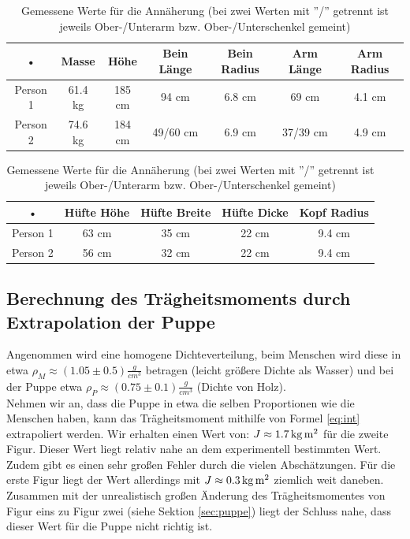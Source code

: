 \begin{table}
\begin{center}
\begin{tabular}{|c|c|c|c|c|c|c|}
\hline 
• & Masse & Höhe & Bein Länge & Bein Radius & Arm Länge & Arm Radius \\
\hline 
Person 1 & 61.4 kg & 185 cm & 94 cm & 6.8 cm & 69 cm & 4.1 cm \\
\hline 
Person 2 & 74.6 kg & 184 cm & 49/60 cm & 6.9 cm & 37/39 cm & 4.9 cm \\
\hline
\end{tabular}
\end{center}

\begin{center}
\begin{tabular}{|c|c|c|c|c|}
\hline
• & Hüfte Höhe & Hüfte Breite & Hüfte Dicke & Kopf Radius \\
\hline
Person 1 & 63 cm & 35 cm & 22 cm & 9.4 cm \\
\hline
Person 2 & 56 cm & 32 cm & 22 cm & 9.4 cm \\ 
\hline
\end{tabular}
\caption{Gemessene Werte für die Annäherung (bei zwei Werten mit ''/'' getrennt ist jeweils Ober-/Unterarm bzw. Ober-/Unterschenkel gemeint)}
\end{center}

\end{table}

\subsection{Berechnung des Trägheitsmoments durch Extrapolation der Puppe}
Angenommen wird eine homogene Dichteverteilung, beim Menschen wird diese in etwa $\rho_M \approx (1.05 \pm 0.5) \frac{g}{cm^3}$ betragen (leicht größere Dichte als Wasser) und bei der Puppe etwa $\rho_P \approx (0.75 \pm 0.1) \frac{g}{cm^3}$ (Dichte von Holz).\\
Nehmen wir an, dass die Puppe in etwa die selben Proportionen wie die Menschen haben, kann das Trägheitsmoment mithilfe von Formel \ref{eq:int} extrapoliert werden. Wir erhalten einen Wert von: $J \approx \unit[1.7]{kg \, m^2}$ für die zweite Figur. Dieser Wert liegt relativ nahe an dem experimentell bestimmten Wert. Zudem gibt es einen sehr großen Fehler durch die vielen Abschätzungen. Für die erste Figur liegt der Wert allerdings mit $J \approx \unit[0.3]{kg \, m^2}$ ziemlich weit daneben. Zusammen mit der unrealistisch großen Änderung des Trägheitsmomentes von Figur eins zu Figur zwei (siehe Sektion \ref{sec:puppe}) liegt der Schluss nahe, dass dieser Wert für die Puppe nicht richtig ist.


